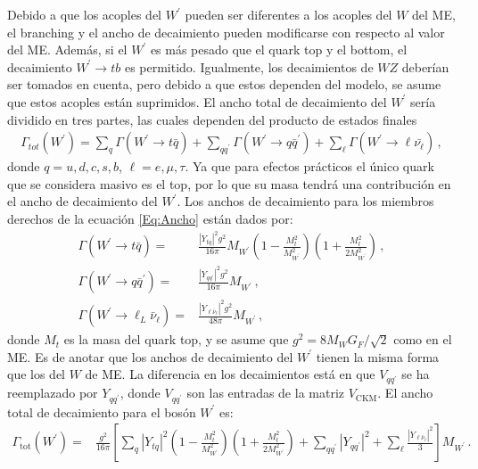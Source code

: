 Debido a que los acoples del $W^{\prime}$ pueden ser diferentes a los acoples del $W$ del ME, el branching y el ancho de decaimiento  pueden modificarse con respecto al valor del ME. Además, si el $W^{\prime}$ es más pesado que el quark top y el bottom, el decaimiento $W^{\prime} \to t b$ es permitido. Igualmente, los decaimientos de $WZ$ deberían ser tomados en cuenta, pero debido a que estos dependen del modelo, se asume que estos acoples están suprimidos. El ancho total de decaimiento del $W^{\prime}$ sería dividido en tres partes, las cuales dependen del producto de estados finales
%
\begin{align}\label{Eq:Ancho}
\Gamma_{tot} (W^{\prime}) = \sum_{q} \Gamma(W^{\prime} \to t \bar{q}) + \sum_{q q^{\prime}}\Gamma(W^{\prime} \to q \bar{q}^{\prime}) + \sum_{\ell} \Gamma(W^{\prime} \to \ell \bar{\nu_{\ell}})\,,
\end{align}
%
donde $q = u, d, c, s, b$, $\ell = e, \mu, \tau$. Ya que para efectos prácticos el único quark que se considera masivo es el top, por lo que su masa tendrá una contribución en el ancho de decaimiento del $W^{\prime}$. Los anchos de decaimiento para los miembros derechos de la ecuación \eqref{Eq:Ancho} están dados por:
%
\begin{align}
\Gamma(W^{\prime} \to t \bar{q}) =& \frac{|Y_{tq}|^2 g^2}{16 \pi} M_{W^{\prime}}\left( 1 - \frac{M_{t}^2}{M_{W^{\prime}}^2} \right)\left( 1 + \frac{M_{t}^2}{2M_{W^{\prime}}^2} \right)\,, \\
\Gamma(W^{\prime} \to q \bar{q}^{\prime}) =& \frac{|Y_{q q^{\prime}}|^2 g^2}{16 \pi} M_{W^{\prime}}\,, \\
\Gamma(W^{\prime} \to \ell_L \bar{\nu}_{\ell}) =& \frac{|Y_{\ell \bar{\nu}_{\ell}}|^2 g^2}{48 \pi} M_{W^{\prime}}\,,
\end{align}
%
donde $M_{t}$ es la masa del quark top, y se asume que $g^2 = 8M_{W}G_F / \sqrt{2}$ como en el ME. Es de anotar que los anchos de decaimiento del $W^{\prime}$ tienen la misma forma que los del $W$ de ME. La diferencia en los decaimientos está en que $V_{q q^{\prime}}$ se ha reemplazado por $Y_{q q^{\prime}}$, donde $V_{q q^{\prime}}$ son las entradas de la matriz $V_{\text{CKM}}$. El ancho total de decaimiento para el bosón $W^{\prime}$ es:
%
\begin{align}
\Gamma_{\text{tot}}(W^{\prime}) =& \frac{g^2}{16 \pi}\left[\sum_{q}|Y_{tq}|^2 \left( 1 - \frac{M_{t}^2}{M_{W^{\prime}}^2} \right)\left( 1 + \frac{M_{t}^2}{2M_{W^{\prime}}^2} \right) + \sum_{q q^{\prime}} |Y_{q q^{\prime}}|^2 + \sum_{\ell} \frac{|Y_{\ell \bar{\nu}_{\ell}}|^2}{3}\right] M_{W^{\prime}}\,.
\end{align}

